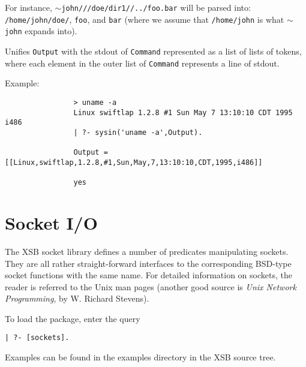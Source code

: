 \begin{description}
For instance, {\tt $\sim$john///doe/dir1//../foo.bar} will be parsed into:
{\tt /home/john/doe/}, {\tt foo}, and {\tt bar} (where we assume that    
{\tt /home/john} is what {\tt $\sim$john} expands into).  



	Unifies {\tt Output} with the stdout of {\tt Command}
represented as a list of lists of tokens, where each element in the
outer list of {\tt Command} represents a line of stdout.

Example:
{\footnotesize
\begin{verbatim}
                > uname -a
                Linux swiftlap 1.2.8 #1 Sun May 7 13:10:10 CDT 1995 i486
                | ?- sysin('uname -a',Output).

                Output = [[Linux,swiftlap,1.2.8,#1,Sun,May,7,13:10:10,CDT,1995,i486]]

                yes
\end{verbatim}}

\end{description}



\section{Socket I/O}

The XSB socket library defines a number of predicates manipulating
sockets. They are all rather straight-forward interfaces to the
corresponding BSD-type socket functions with the same name. For detailed
information on sockets, the reader is referred to the Unix man pages
(another good source is \emph{Unix Network Programming}, by W. Richard
Stevens).

To load the package, enter the query 
\begin{verbatim}
| ?- [sockets].
\end{verbatim}

Examples can be found in the examples directory in the XSB source tree.

